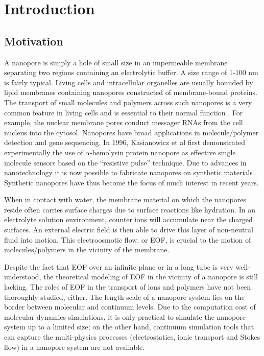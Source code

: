 \chapter{Introduction}\label{chpt:intro}
\section{Motivation}
\label{sec:intro-motiv}
A nanopore is simply a hole of small size in an impermeable membrane separating two regions containing an electrolytic buffer. A size range of 1-100 nm is fairly typical. Living cells and intracellular organelles are usually bounded by lipid membranes containing nanopores constructed of membrane-bound proteins. The transport of small molecules and polymers across such nanopores is a very common feature in living cells and is essential to their normal function \cite{Alberts,Pfanner_90,Matouschek,Martin,Kunkele}. For example, the nuclear membrane pores conduct messager RNAs from the cell nucleus into the cytosol. Nanopores have broad applications in molecule\//polymer detection and gene sequencing. In 1996,  Kasianowicz \cite{Kasianowicz1996} et al first demonstrated experimentally the use of $\alpha$-hemolysin protein  nanopore as effective single molecule sensors based on the ``resistive pulse'' technique. Due to advances in nanotechnology it is now possible to fabricate nanopores on synthetic materials \cite{li_nat_mat03,storm_physRevE05,storm_nanolett05,dekker_nano_lett06,bayley_nanotechnology_2010,Garaj2010,Schneider2010,Merchant2010} . Synthetic nanopores have thus become the focus of much interest in recent years.

When in contact with water, the membrane material on which the nanopores reside often carries surface charges due to surface reactions like hydration. In an electrolyte solution environment, counter ions will accumulate near the charged surfaces. An external electric field is then able to drive this layer of non-neutral fluid into motion. This electroosmotic flow, or EOF, is crucial to the motion of molecules\//polymers in the vicinity of the membrane. 

Despite the fact that EOF over an infinite plane or in a long tube is very well-understood, the theoretical modeling of EOF in the vicinity of a nanopore is still lacking. The roles of EOF in the transport of ions and polymers have not been thoroughly studied, either. The length scale of a nanopore system lies on the border between molecular and continuum levels. Due to the computation cost of molecular dynamics simulations, it is only practical to simulate the nanopore system up to a limited size; on the other hand, continuum simulation tools that can capture the multi-physics processes (electrostatics, ionic transport and Stokes flow) in a nanopore system are not available. 

